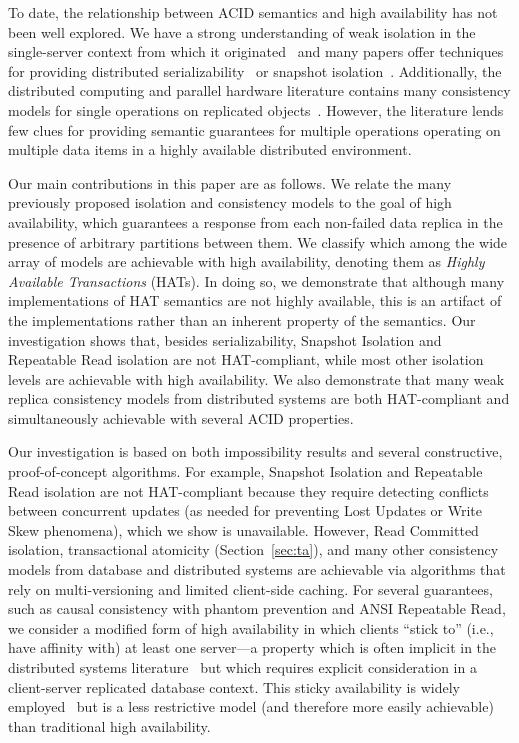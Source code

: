 To date, the relationship between ACID semantics and high
availability has not been well explored. We have a strong
understanding of weak isolation in the single-server context from
which it originated~\cite{adya, ansicritique, gray-isolation} and many
papers offer techniques for providing distributed
serializability~\cite{bernstein-book, spanner, daudjee-session,
  hstore, calvin} or snapshot
isolation~\cite{kemme-thesis,walter}. Additionally, the distributed computing and parallel
hardware literature contains many consistency models for single
operations on replicated objects~\cite{pnuts, herlihy-art, eiger, cac,
  sessionguarantees}. However, the literature lends few clues for
providing semantic guarantees for multiple operations operating on
multiple data items in a highly available distributed environment.

Our main contributions in this paper are as follows. We relate the
many previously proposed isolation and consistency models to the goal
of high availability, which guarantees a response from each non-failed
data replica in the presence of arbitrary partitions between them.  We
classify which among the wide array of models are achievable with high
availability, denoting them as {\em Highly Available Transactions}
(HATs). In doing so, we demonstrate that although many implementations
of HAT semantics are not highly available, this is an artifact of the
implementations rather than an inherent property of the semantics. Our
investigation shows that, besides serializability, Snapshot Isolation
and Repeatable Read isolation are not HAT-compliant, while most other
isolation levels are achievable with high availability. We also
demonstrate that many weak replica consistency models from distributed
systems are both HAT-compliant and simultaneously achievable with
several ACID properties.

Our investigation is based on both impossibility results and several
constructive, proof-of-concept algorithms. For example, Snapshot
Isolation and Repeatable Read isolation are not HAT-compliant because
they require detecting conflicts between concurrent updates (as needed
for preventing Lost Updates or Write Skew phenomena), which we show is
unavailable. However, Read Committed isolation, transactional
atomicity (Section~\ref{sec:ta}), and many other consistency models
from database and distributed systems are achievable via algorithms
that rely on multi-versioning and limited client-side caching. For
several guarantees, such as causal consistency with phantom prevention
and ANSI Repeatable Read, we consider a modified form of high
availability in which clients ``stick to'' (i.e., have affinity with)
at least one server---a property which is often implicit in the
distributed systems literature~\cite{herlihy-art, eiger, cac} but
which requires explicit consideration in a client-server replicated
database context. This sticky availability is widely
employed~\cite{eiger, vogels-defs} but is a less restrictive model
(and therefore more easily achievable) than traditional high
availability.

